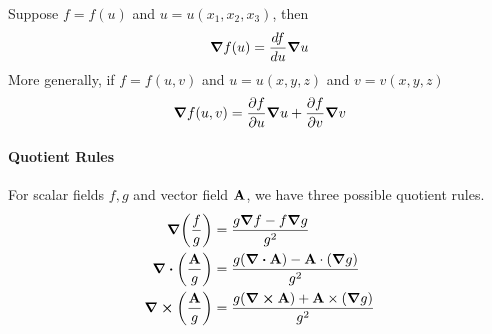 				Suppose $f=f(u)$ and $u = u(x_1,x_2,x_3)$, then
				\begin{equation}
					\grad f(u) = \dv{f}{u} \grad u 
				\end{equation}
				More generally, if $f = f(u,v)$ and $u = u(x,y,z)$ and $v = v(x,y,z)$
				\begin{equation}
					\grad f(u,v) = \pdv{f}{u}\grad u + \pdv{f}{v} \grad v  
				\end{equation}
			\paragraph{Quotient Rules}
				For scalar fields $f,g$ and vector field $\vb{A}$, we have three possible quotient rules.
				\begin{align*}
					\grad\qty(\frac{f}{g}) &= \frac{g\grad f - f\grad g}{g^2}\\
					\div(\frac{\vb{A}}{g}) &= \frac{g(\div \vb{A}) - \vb{A} \cdot (\grad g)}{g^2}\\
					\curl\qty(\frac{\vb{A}}{g}) &= \frac{g(\curl \vb A) + \vb{A}\times (\grad g)}{g^2} 
				\end{align*}
